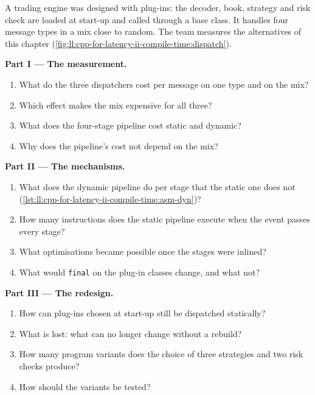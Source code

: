 \begin{problem}\label{pb:ll:cpp-for-latency-ii-compile-time:1}
A trading engine was designed with plug-ins: the decoder, book, strategy and risk check are loaded at start-up and called
through a base class. It handles four message types in a mix close to random. The team measures the alternatives of this
chapter (\cref{fig:ll:cpp-for-latency-ii-compile-time:dispatch}).

\medskip\noindent\textbf{Part I --- The measurement.}
\begin{enumerate}
\item What do the three dispatchers cost per message on one type and on the mix?
\item Which effect makes the mix expensive for all three?
\item What does the four-stage pipeline cost static and dynamic?
\item Why does the pipeline's cost not depend on the mix?
\end{enumerate}

\medskip\noindent\textbf{Part II --- The mechanisms.}
\begin{enumerate}[resume]
\item What does the dynamic pipeline do per stage that the static one does not (\cref{lst:ll:cpp-for-latency-ii-compile-time:asm-dyn})?
\item How many instructions does the static pipeline execute when the event passes every stage?
\item What optimisations became possible once the stages were inlined?
\item What would \texttt{final} on the plug-in classes change, and what not?
\end{enumerate}

\medskip\noindent\textbf{Part III --- The redesign.}
\begin{enumerate}[resume]
\item How can plug-ins chosen at start-up still be dispatched statically?
\item What is lost: what can no longer change without a rebuild?
\item How many program variants does the choice of three strategies and two risk checks produce?
\item How should the variants be tested?
\end{enumerate}


\end{problem}
